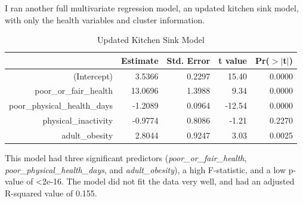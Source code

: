 \documentclass[12pt,twoside]{amherstthesis}
\begin{document}
  \begin{Shaded}
  \end{Shaded}
  
  I ran another full multivariate regression model, an updated kitchen
  sink model, with only the health variables and cluster information.
  
  \begin{Shaded}
  \begin{Highlighting}[]
  \StringTok{ }\OperatorTok{~}
  \end{Highlighting}
  \end{Shaded}
  
  \begin{table}[ht]
  \centering
  \begin{tabular}{rrrrr}
    \hline
   & Estimate & Std. Error & t value & Pr($>$$|$t$|$) \\ 
    \hline
  (Intercept) & 3.5366 & 0.2297 & 15.40 & 0.0000 \\ 
    poor\_or\_fair\_health & 13.0696 & 1.3988 & 9.34 & 0.0000 \\ 
    poor\_physical\_health\_days & -1.2089 & 0.0964 & -12.54 & 0.0000 \\ 
    physical\_inactivity & -0.9774 & 0.8086 & -1.21 & 0.2270 \\ 
    adult\_obesity & 2.8044 & 0.9247 & 3.03 & 0.0025 \\ 
     \hline
  \end{tabular}
  \caption{Updated Kitchen Sink Model} 
  \end{table}
  
  This model had three significant predictors
  (\emph{poor\_or\_fair\_health}, \emph{poor\_physical\_health\_days}, and
  \emph{adult\_obesity}), a high F-statistic, and a low p-value of
  \textless{}2e-16. The model did not fit the data very well, and had an
  adjusted R-squared value of 0.155.
  
\end{document}
